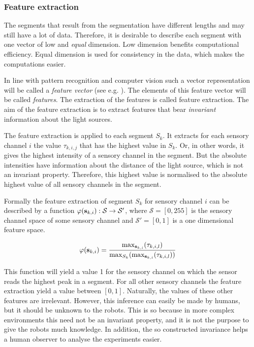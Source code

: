 \subsubsection{Feature extraction}


The segments that result from the segmentation have different lengths and may still have a lot of data. Therefore, it is desirable to describe each segment with one vector of low and {\em equal} dimension. Low dimension benefits computational efficiency. Equal dimension is used for consistency in the data, which makes the computations easier.

In line with pattern recognition and computer vision such a vector representation will be called a {\em feature vector} (see e.g. \citealt{fu:1976}). The elements of this feature vector will be called {\em features}. The extraction of the features is called feature extraction. The aim of the feature extraction is to extract features that bear {\em invariant} information about the light sources.


The feature extraction is applied to each segment $S_k$. It extracts for each sensory channel $i$ the value $\tau_{k,i,j}$ that has the highest value in $S_k$. Or, in other words, it gives the highest intensity of a sensory channel in the segment. But the absolute intensities have information about the distance of the light source, which is not an invariant property. Therefore, this highest value is normalised to the absolute highest value of all sensory channels in the segment. 

Formally the feature extraction of segment $S_k$ for sensory channel $i$ can be described by a function $\varphi({\bf s}_{k,i}):{\mathcal{S}} \rightarrow {\mathcal{S}'}$, where ${\mathcal{S}}=[0,255]$ is the sensory channel space of some sensory channel and ${\mathcal S}'=[0,1]$ is a one dimensional feature space.

\begin{eqnarray}
\varphi({\bf s}_{k,i}) = \frac{\max_{{\bf s}_{k,i}} (\tau_{k,i,l})}{\max_{S_k} (\max_{{\bf s}_{k,i}} (\tau_{k,i,l}))}
\label{e:sc-norm}
\end{eqnarray}


This function will yield a value 1 for the sensory channel on which the sensor reads the highest peak in a segment. For all other sensory channels the feature extraction yield a value between $[0,1]$. Naturally, the values of these other features are irrelevant. However, this inference can easily be made by humans, but it should be unknown to the robots. This is so because in more complex environments this need not be an invariant property, and it is not the purpose to give the robots much knowledge. In addition, the so constructed invariance helps a human observer to analyse the experiments easier. 

